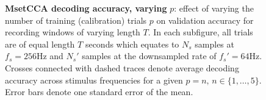 \begin{figure}[htp]
\hfill
{}


\caption[MsetCCA decoding accuracy, varying $p$: effect of varying the number of training (calibration) trials $p$ on validation accuracy for recording windows of varying length $T$.]{\textbf{MsetCCA decoding accuracy, varying }$p$: effect of varying the number of training (calibration) trials $p$ on validation accuracy for recording windows of varying length $T$. In each subfigure, all trials are of equal length $T$ seconds which equates to $N_s$ samples at $f_s=256$Hz and $N_s'$ samples at the downsampled rate of $f_s'=64$Hz. Crosses connected with dashed traces denote average decoding accuracy across stimulus frequencies for a given $p=n, \, n\in\{1, \dots, 5\}$. Error bars denote one standard error of the mean.}
\label{fig:mset-acc-nt}
\end{figure}


